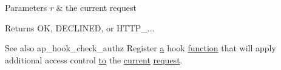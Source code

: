 \begin{DoxyParams}{Parameters}
{\em r} & the current request \\
\hline
\end{DoxyParams}
\begin{DoxyReturn}{Returns}
OK, D\+E\+C\+L\+I\+N\+ED, or H\+T\+T\+P\+\_\+...
\end{DoxyReturn}
\begin{DoxySeeAlso}{See also}
ap\+\_\+hook\+\_\+check\+\_\+authz Register \hyperlink{pcre_8txt_a841271aab70f5cda9412a19c7753f02c}{a} hook \hyperlink{pcretest_8txt_abd306f12a46ac3f6be69579bceb817d0}{function} that will apply additional access control \hyperlink{pcretest_8txt_aa22c98f630e4b3fe86ee17ce5150c62f}{to} the \hyperlink{group__APACHE__CORE__CONFIG_ga4b3e87cb39cac2296c5083f27321f1f4}{current} \hyperlink{ab_8c_ae55c2591fd7f232c48d3f252f18a869a}{request}. 
\end{DoxySeeAlso}

